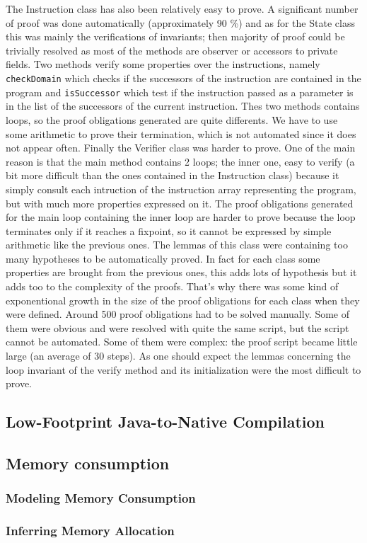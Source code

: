 The Instruction class has also been relatively easy to prove.  A
significant number of proof was done automatically (approximately 90
\%) and as for the State class this was mainly the verifications of
invariants; then majority of proof could be trivially resolved as most
of the methods are observer or accessors to private fields.  Two
methods verify some properties over the instructions, namely {\tt
checkDomain} which checks if the successors of the instruction are
contained in the program and {\tt isSuccessor} which test if the
instruction passed as a parameter is in the list of the successors of
the current instruction.  Thes two methods contains loops, so the
proof obligations generated are quite differents. We have to use some
arithmetic to prove their termination, which is not automated since it
does not appear often.  Finally the Verifier class was harder to
prove. One of the main reason is that the main method contains 2
loops; the inner one, easy to verify (a bit more difficult than the
ones contained in the Instruction class) because it simply consult
each intruction of the instruction array representing the program, but
with much more properties expressed on it. The proof obligations
generated for the main loop containing the inner loop are harder to
prove because the loop terminates only if it reaches a fixpoint, so it
cannot be expressed by simple arithmetic like the previous ones.  The
lemmas of this class were containing too many hypotheses to be
automatically proved.  In fact for each class some properties are
brought from the previous ones, this adds lots of hypothesis but it
adds too to the complexity of the proofs.  That's why there was some
kind of exponentional growth in the size of the proof obligations for
each class when they were defined.  Around 500 proof obligations had
to be solved manually.  Some of them were obvious and were resolved
with quite the same script, but the script cannot be automated.  Some
of them were complex: the proof script became little large (an average
of 30 steps).  As one should expect the lemmas concerning the loop
invariant of the verify method and its initialization were the most
difficult to prove.




\subsection{Low-Footprint Java-to-Native Compilation}

\subsection{Memory consumption}

\subsubsection{Modeling Memory Consumption}\label{sec:verif}

\subsubsection{Inferring Memory Allocation}\label{sec:infer}


